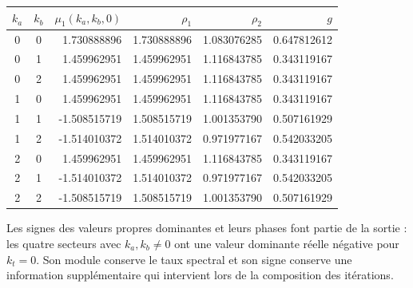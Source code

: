 \begin{center}
\small
\begin{tabular}{ccrrrr}
\toprule
$k_a$&$k_b$&$\mu_1(k_a,k_b,0)$&$\rho_1$&$\rho_2$&$g$\\
\midrule
0&0&1.730888896&1.730888896&1.083076285&0.647812612\\
0&1&1.459962951&1.459962951&1.116843785&0.343119167\\
0&2&1.459962951&1.459962951&1.116843785&0.343119167\\
1&0&1.459962951&1.459962951&1.116843785&0.343119167\\
1&1&-1.508515719&1.508515719&1.001353790&0.507161929\\
1&2&-1.514010372&1.514010372&0.971977167&0.542033205\\
2&0&1.459962951&1.459962951&1.116843785&0.343119167\\
2&1&-1.514010372&1.514010372&0.971977167&0.542033205\\
2&2&-1.508515719&1.508515719&1.001353790&0.507161929\\
\bottomrule
\end{tabular}
\end{center}

Les signes des valeurs propres dominantes et leurs phases font partie de la
sortie : les quatre secteurs avec $k_a,k_b\ne0$ ont une valeur dominante réelle négative
pour $k_t=0$. Son module conserve le taux spectral et son signe conserve une
information supplémentaire qui intervient lors de la composition des itérations.

